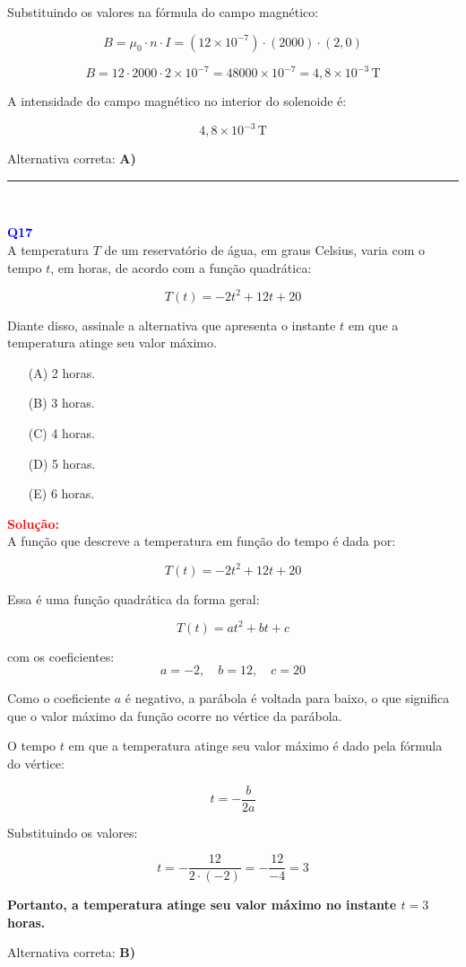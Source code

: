 \documentclass[a4paper,12pt]{article}
\begin{document}
\begin{flushleft}
Substituindo os valores na fórmula do campo magnético:

\[
B = \mu_0 \cdot n \cdot I
= (12 \times 10^{-7}) \cdot (2000) \cdot (2{,}0)
\]

\[
B = 12 \cdot 2000 \cdot 2 \times 10^{-7}
= 48000 \times 10^{-7}
= 4{,}8 \times 10^{-3}\,\text{T}
\]

A intensidade do campo magnético no interior do solenoide é:

\[
\boxed{4{,}8 \times 10^{-3}\,\text{T}}
\]

Alternativa correta: \colorbox{green!50}{\textbf{A)}}

\end{flushleft}

\noindent\rule{\linewidth}{0.6pt}\\

\begin{flushleft}
\textbf{\textcolor{blue}{\Large Q17}}\\
A temperatura \( T \) de um reservatório de água, em graus Celsius, varia com o tempo \( t \), em horas, de acordo com a função quadrática:

\[
T(t) = -2t^2 + 12t + 20
\]

Diante disso, assinale a alternativa que apresenta o instante \( t \) em que a temperatura atinge seu valor máximo.
\begin{itemize}
\item[(A)] 2 horas.
\item[(B)] 3 horas.
\item[(C)] 4 horas.
\item[(D)] 5 horas.
\item[(E)] 6 horas.
\end{itemize}

\vspace{0.5cm}

\textcolor{red}{\textbf{Solução:}}\\

A função que descreve a temperatura em função do tempo é dada por:

\[
T(t) = -2t^2 + 12t + 20
\]

Essa é uma função quadrática da forma geral:

\[
T(t) = at^2 + bt + c
\]

com os coeficientes:
\[
a = -2, \quad b = 12, \quad c = 20
\]

Como o coeficiente \( a \) é negativo, a parábola é voltada para baixo, o que significa que o valor máximo da função ocorre no vértice da parábola.

O tempo \( t \) em que a temperatura atinge seu valor máximo é dado pela fórmula do vértice:

\[
t = -\frac{b}{2a}
\]

Substituindo os valores:

\[
t = -\frac{12}{2 \cdot (-2)} = -\frac{12}{-4} = 3
\]

\textbf{Portanto, a temperatura atinge seu valor máximo no instante \( t = 3 \) horas.}

Alternativa correta: \colorbox{green!50}{\textbf{B)}}

\end{flushleft}
\end{document}
